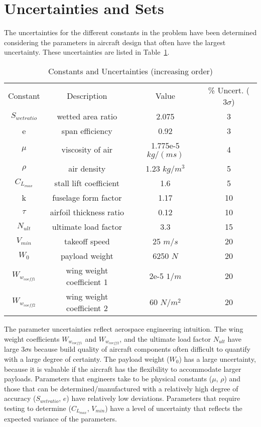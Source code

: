 \section{Uncertainties and Sets}

The uncertainties for the different constants in the problem have been determined
considering the parameters in aircraft design that often have the largest uncertainty.
These uncertainties are listed in Table~\ref{tab:uncertainties}.

\begin{table}
\begin{center}
\caption{\label{tab:uncertainties} Constants and Uncertainties (increasing order)}
\begin{tabular}{c c c c}
\hline
Constant & Description & Value & \% Uncert. ($3\sigma$) \\
$S_{wetratio}$ & wetted area ratio & 2.075 & 3\\
e & span efficiency & 0.92 & 3\\
$\mu$ & viscosity of air & 1.775e-5 $kg/(ms)$ & 4 \\
$\rho$ & air density & 1.23 $kg/m^3$ & 5 \\
$C_{L_{max}}$ & stall lift coefficient & 1.6 & 5\\
k & fuselage form factor & 1.17 & 10\\
$\tau$ & airfoil thickness ratio & 0.12 & 10\\
$N_{ult}$ & ultimate load factor & 3.3 & 15\\
$V_{min}$ & takeoff speed & 25 $m/s$ & 20\\
$W_0$ & payload weight & 6250 $N$ & 20\\
$W_{w_{coeff1}}$ & wing weight coefficient 1 & 2e-5 $1/m$ & 20\\
$W_{w_{coeff2}}$ & wing weight coefficient 2 & 60 $N/m^2$ & 20\\
\hline
\end{tabular}
\end{center}
\end{table}

The parameter uncertainties reflect aerospace engineering intuition.
The wing weight coefficients $W_{w_{coeff1}}$ and $W_{w_{coeff2}}$, and the ultimate load factor $N_{ult}$ have
large $3\sigma$s because build quality of aircraft components often difficult to quantify with a large degree of certainty.
The payload weight ($W_0$) has a large uncertainty, because it is valuable if the aircraft
has the flexibility to accommodate larger payloads. Parameters that engineers take to be
physical constants ($\mu$, $\rho$) and those that can be determined/manufactured with a relatively
high degree of accuracy ($S_{wetratio}$, $e$) have relatively low deviations.
Parameters that require testing to determine ($C_{L_{max}}$, $V_{min}$) have a level of uncertainty
that reflects the expected variance of the parameters.

